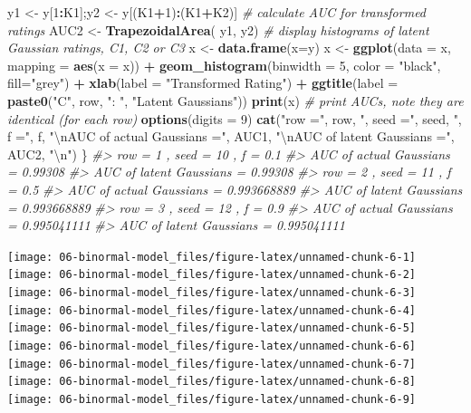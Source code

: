 \documentclass[
]{book}
\newenvironment{Shaded}{\begin{snugshade}}{\end{snugshade}}
\newcommand{\CharTok}[1]{\textcolor[rgb]{0.31,0.60,0.02}{#1}}
\newcommand{\CommentTok}[1]{\textcolor[rgb]{0.56,0.35,0.01}{\textit{#1}}}
\newcommand{\DataTypeTok}[1]{\textcolor[rgb]{0.13,0.29,0.53}{#1}}
\newcommand{\DecValTok}[1]{\textcolor[rgb]{0.00,0.00,0.81}{#1}}
\newcommand{\KeywordTok}[1]{\textcolor[rgb]{0.13,0.29,0.53}{\textbf{#1}}}
\newcommand{\NormalTok}[1]{#1}
\newcommand{\OperatorTok}[1]{\textcolor[rgb]{0.81,0.36,0.00}{\textbf{#1}}}
\newcommand{\StringTok}[1]{\textcolor[rgb]{0.31,0.60,0.02}{#1}}
\begin{document}
\begin{Shaded}
\begin{Highlighting}[]
\NormalTok{  y1 <-}\StringTok{ }\NormalTok{y[}\DecValTok{1}\OperatorTok{:}\NormalTok{K1];y2 <-}\StringTok{ }\NormalTok{y[(K1}\OperatorTok{+}\DecValTok{1}\NormalTok{)}\OperatorTok{:}\NormalTok{(K1}\OperatorTok{+}\NormalTok{K2)]}
  \CommentTok{# calculate AUC for transformed ratings}
\NormalTok{  AUC2 <-}\StringTok{ }\KeywordTok{TrapezoidalArea}\NormalTok{( y1, y2)}
  \CommentTok{# display histograms of latent Gaussian ratings, C1, C2 or C3}
\NormalTok{  x <-}\StringTok{ }\KeywordTok{data.frame}\NormalTok{(}\DataTypeTok{x=}\NormalTok{y)}
\NormalTok{  x <-}\StringTok{  }\KeywordTok{ggplot}\NormalTok{(}\DataTypeTok{data =}\NormalTok{ x, }\DataTypeTok{mapping =} \KeywordTok{aes}\NormalTok{(}\DataTypeTok{x =}\NormalTok{ x)) }\OperatorTok{+}
\StringTok{    }\KeywordTok{geom_histogram}\NormalTok{(}\DataTypeTok{binwidth =} \DecValTok{5}\NormalTok{, }\DataTypeTok{color =} \StringTok{"black"}\NormalTok{, }\DataTypeTok{fill=}\StringTok{"grey"}\NormalTok{) }\OperatorTok{+}
\StringTok{    }\KeywordTok{xlab}\NormalTok{(}\DataTypeTok{label =} \StringTok{"Transformed Rating"}\NormalTok{) }\OperatorTok{+}\StringTok{ }
\StringTok{    }\KeywordTok{ggtitle}\NormalTok{(}\DataTypeTok{label =} \KeywordTok{paste0}\NormalTok{(}\StringTok{"C"}\NormalTok{, row, }\StringTok{": "}\NormalTok{, }\StringTok{"Latent Gaussians"}\NormalTok{))}
  \KeywordTok{print}\NormalTok{(x)}
\CommentTok{# print AUCs, note they are identical (for each row)  }
\KeywordTok{options}\NormalTok{(}\DataTypeTok{digits =} \DecValTok{9}\NormalTok{)}
  \KeywordTok{cat}\NormalTok{(}\StringTok{"row ="}\NormalTok{, row, }\StringTok{", seed ="}\NormalTok{, seed, }\StringTok{", f ="}\NormalTok{, f, }
      \StringTok{"}\CharTok{\textbackslash{}n}\StringTok{AUC of actual Gaussians ="}\NormalTok{, AUC1, }
      \StringTok{"}\CharTok{\textbackslash{}n}\StringTok{AUC of latent Gaussians ="}\NormalTok{, AUC2, }\StringTok{"}\CharTok{\textbackslash{}n}\StringTok{"}\NormalTok{)}
\NormalTok{\}}
\CommentTok{#> row = 1 , seed = 10 , f = 0.1 }
\CommentTok{#> AUC of actual Gaussians = 0.99308 }
\CommentTok{#> AUC of latent Gaussians = 0.99308}
\CommentTok{#> row = 2 , seed = 11 , f = 0.5 }
\CommentTok{#> AUC of actual Gaussians = 0.993668889 }
\CommentTok{#> AUC of latent Gaussians = 0.993668889}
\CommentTok{#> row = 3 , seed = 12 , f = 0.9 }
\CommentTok{#> AUC of actual Gaussians = 0.995041111 }
\CommentTok{#> AUC of latent Gaussians = 0.995041111}
\end{Highlighting}
\end{Shaded}

\texttt{[image: 06-binormal-model\_files/figure-latex/unnamed-chunk-6-1]} \texttt{[image: 06-binormal-model\_files/figure-latex/unnamed-chunk-6-2]} \texttt{[image: 06-binormal-model\_files/figure-latex/unnamed-chunk-6-3]} \texttt{[image: 06-binormal-model\_files/figure-latex/unnamed-chunk-6-4]} \texttt{[image: 06-binormal-model\_files/figure-latex/unnamed-chunk-6-5]} \texttt{[image: 06-binormal-model\_files/figure-latex/unnamed-chunk-6-6]} \texttt{[image: 06-binormal-model\_files/figure-latex/unnamed-chunk-6-7]} \texttt{[image: 06-binormal-model\_files/figure-latex/unnamed-chunk-6-8]} \texttt{[image: 06-binormal-model\_files/figure-latex/unnamed-chunk-6-9]}
\end{document}
